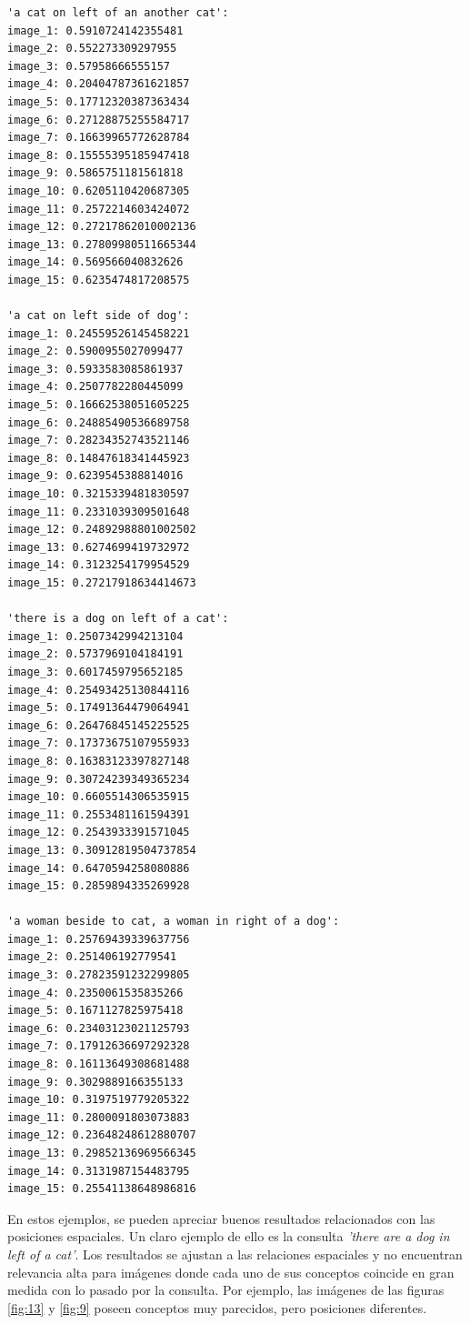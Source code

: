 \begin{verbatim}
'a cat on left of an another cat':
image_1: 0.5910724142355481
image_2: 0.552273309297955
image_3: 0.57958666555157
image_4: 0.20404787361621857
image_5: 0.17712320387363434
image_6: 0.27128875255584717
image_7: 0.16639965772628784
image_8: 0.15555395185947418
image_9: 0.5865751181561818
image_10: 0.6205110420687305
image_11: 0.2572214603424072
image_12: 0.27217862010002136
image_13: 0.27809980511665344
image_14: 0.569566040832626
image_15: 0.6235474817208575

'a cat on left side of dog':
image_1: 0.24559526145458221
image_2: 0.5900955027099477
image_3: 0.5933583085861937
image_4: 0.2507782280445099
image_5: 0.16662538051605225
image_6: 0.24885490536689758
image_7: 0.28234352743521146
image_8: 0.14847618341445923
image_9: 0.6239545388814016
image_10: 0.3215339481830597
image_11: 0.2331039309501648
image_12: 0.24892988801002502
image_13: 0.6274699419732972
image_14: 0.3123254179954529
image_15: 0.27217918634414673

'there is a dog on left of a cat':
image_1: 0.2507342994213104
image_2: 0.5737969104184191
image_3: 0.6017459795652185
image_4: 0.25493425130844116
image_5: 0.17491364479064941
image_6: 0.26476845145225525
image_7: 0.17373675107955933
image_8: 0.16383123397827148
image_9: 0.30724239349365234
image_10: 0.6605514306535915
image_11: 0.2553481161594391
image_12: 0.2543933391571045
image_13: 0.30912819504737854
image_14: 0.6470594258080886
image_15: 0.2859894335269928

'a woman beside to cat, a woman in right of a dog':
image_1: 0.25769439339637756
image_2: 0.251406192779541
image_3: 0.27823591232299805
image_4: 0.2350061535835266
image_5: 0.1671127825975418
image_6: 0.23403123021125793
image_7: 0.17912636697292328
image_8: 0.16113649308681488
image_9: 0.3029889166355133
image_10: 0.3197519779205322
image_11: 0.2800091803073883
image_12: 0.23648248612880707
image_13: 0.29852136969566345
image_14: 0.3131987154483795
image_15: 0.25541138648986816

\end{verbatim}

En estos ejemplos, se pueden apreciar buenos resultados relacionados con las posiciones espaciales. Un claro ejemplo de ello es la consulta \textit{'there are a dog in left of a cat'}. Los resultados se ajustan a las relaciones espaciales y no encuentran relevancia alta para im\'agenes donde cada uno de sus conceptos coincide en gran medida con lo pasado por la consulta. Por ejemplo, las im\'agenes de las figuras \ref{fig:13} y \ref{fig:9} poseen conceptos muy parecidos, pero posiciones diferentes.

